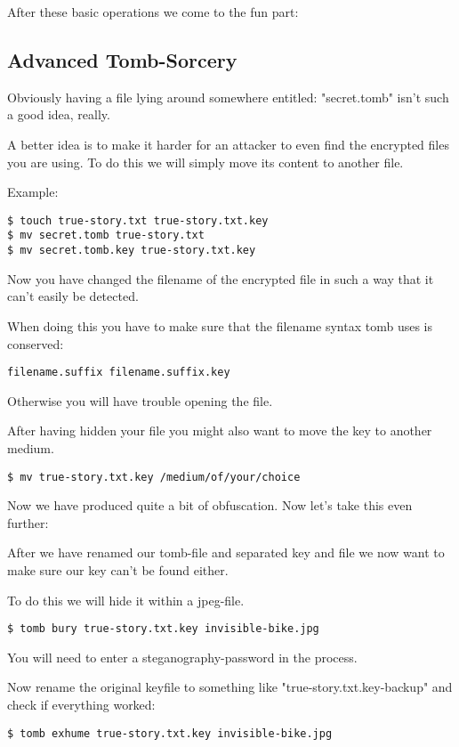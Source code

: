 \documentclass{article}
\begin{document}
 After these basic operations we come to the fun part: 
\subsection{Advanced Tomb-Sorcery}


 Obviously having a file lying around somewhere entitled: "secret.tomb" isn't such a good idea, really.


 A better idea is to make it harder for an attacker to even find the encrypted files you are using. To do this we will simply move its content to another file. 


 Example:
\begin{lstlisting}
$ touch true-story.txt true-story.txt.key
$ mv secret.tomb true-story.txt
$ mv secret.tomb.key true-story.txt.key
\end{lstlisting}



 Now you have changed the filename of the encrypted file in such a way that it can't easily be detected.


 When doing this you have to make sure that the filename syntax tomb uses is conserved:
\begin{lstlisting}
filename.suffix filename.suffix.key
\end{lstlisting}



 Otherwise you will have trouble opening the file. 


 After having hidden your file you might also want to move the key to another medium. 
\begin{lstlisting}
$ mv true-story.txt.key /medium/of/your/choice
\end{lstlisting}



 Now we have produced quite a bit of obfuscation. Now let's take this even further:


 After we have renamed our tomb-file and separated key and file we now want to make sure our key can't be found either. 


 To do this we will hide it within a jpeg-file. 
\begin{lstlisting}
$ tomb bury true-story.txt.key invisible-bike.jpg
\end{lstlisting}



 You will need to enter a steganography-password in the process.


 Now rename the original keyfile to something like "true-story.txt.key-backup" and check if everything worked:
\begin{lstlisting}
$ tomb exhume true-story.txt.key invisible-bike.jpg
\end{lstlisting}
\end{document}
